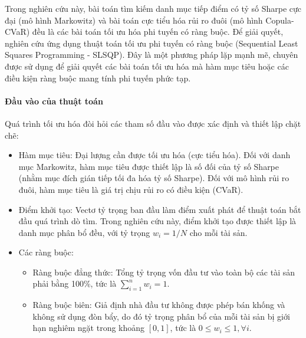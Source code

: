 Trong nghiên cứu này, bài toán tìm kiếm danh mục tiếp điểm có tỷ số Sharpe cực đại (mô hình Markowitz) và bài toán cực tiểu hóa rủi ro đuôi (mô hình Copula-CVaR) đều là các bài toán tối ưu hóa phi tuyến có ràng buộc. Để giải quyết, nghiên cứu ứng dụng thuật toán tối ưu phi tuyến có ràng buộc (Sequential Least Squares Programming - SLSQP). Đây là một phương pháp lặp mạnh mẽ, chuyên được sử dụng để giải quyết các bài toán tối ưu hóa mà hàm mục tiêu hoặc các điều kiện ràng buộc mang tính phi tuyến phức tạp.
\paragraph{Đầu vào của thuật toán} 
Quá trình tối ưu hóa đòi hỏi các tham số đầu vào được xác định và thiết lập chặt chẽ:
\begin{itemize}
    \item Hàm mục tiêu: Đại lượng cần được tối ưu hóa (cực tiểu hóa). Đối với danh mục Markowitz, hàm mục tiêu được thiết lập là số đối của tỷ số Sharpe (nhằm mục đích gián tiếp tối đa hóa tỷ số Sharpe). Đối với mô hình rủi ro đuôi, hàm mục tiêu là giá trị chịu rủi ro có điều kiện (CVaR).
    \item Điểm khởi tạo: Vectơ tỷ trọng ban đầu làm điểm xuất phát để thuật toán bắt đầu quá trình dò tìm. Trong nghiên cứu này, điểm khởi tạo được thiết lập là danh mục phân bổ đều, với tỷ trọng $w_i = 1/N$ cho mỗi tài sản.
    \item Các ràng buộc:
    \begin{itemize}
        \item Ràng buộc đẳng thức: Tổng tỷ trọng vốn đầu tư vào toàn bộ các tài sản phải bằng 100\%, tức là $\sum_{i=1}^{n} w_i = 1$.
        \item Ràng buộc biên: Giả định nhà đầu tư không được phép bán khống và không sử dụng đòn bẩy, do đó tỷ trọng phân bổ của mỗi tài sản bị giới hạn nghiêm ngặt trong khoảng $[0, 1]$, tức là $0 \le w_i \le 1, \forall i$.
    \end{itemize}
    
\end{itemize}
